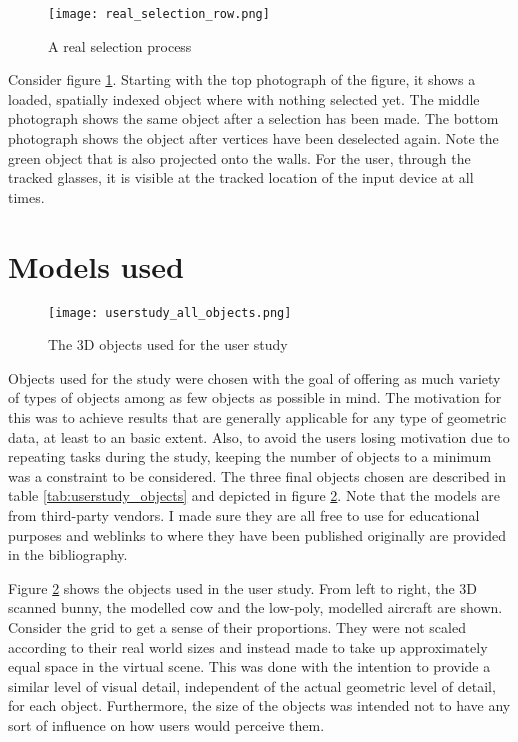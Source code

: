 \begin{figure}[htb]
  \centering
  \texttt{[image: real\_selection\_row.png]}\\ %
  \caption{A real selection process}\label{fig:real_selection}
\end{figure}

Consider figure \ref{fig:real_selection}. Starting with the top photograph of the figure, it shows a loaded, spatially indexed object where with nothing selected yet. The middle photograph shows the same object after a selection has been made. The bottom photograph shows the object after vertices have been deselected again. Note the green object that is also projected onto the walls. For the user, through the tracked glasses, it is visible at the tracked location of the input device at all times.

	\section{Models used}
	\label{sec:models_used}
%
%

\begin{figure}[htb]
  \centering
  \texttt{[image: userstudy\_all\_objects.png]}\\ %
  \caption{The 3D objects used for the user study}\label{fig:all_objects}
\end{figure}

Objects used for the study were chosen with the goal of offering as much variety of types of objects among as few objects as possible in mind. The motivation for this was to achieve results that are generally applicable for any type of geometric data, at least to an basic extent. Also, to avoid the users losing motivation due to repeating tasks during the study, keeping the number of objects to a minimum was a constraint to be considered. The three final objects chosen are described in table \ref{tab:userstudy_objects} and depicted in figure \ref{fig:all_objects}. Note that the models are from third-party vendors. I made sure they are all free to use for educational purposes and weblinks to where they have been published originally are provided in the bibliography.

Figure \ref{fig:all_objects} shows the objects used in the user study. From left to right, the 3D scanned bunny, the modelled cow and the low-poly, modelled aircraft are shown. Consider the grid to get a sense of their proportions. They were not scaled according to their real world sizes and instead made to take up approximately equal space in the virtual scene. This was done with the intention to provide a similar level of visual detail, independent of the actual geometric level of detail, for each object. Furthermore, the size of the objects was intended not to have any sort of influence on how users would perceive them.


